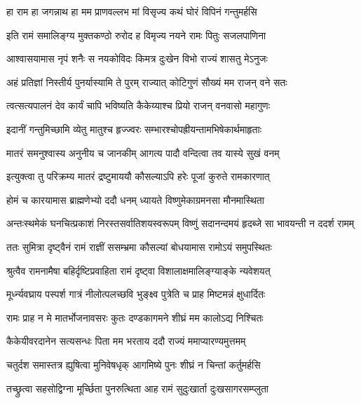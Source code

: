 \twolineshloka
{हा राम हा जगन्नाथ हा मम प्राणवल्लभ}
{मां विसृज्य कथं घोरं विपिनं गन्तुमर्हसि} %

\twolineshloka
{इति रामं समालिङ्ग्य मुक्तकण्ठो रुरोद ह}
{विमृज्य नयने रामः पितुः सजलपाणिना} %

\twolineshloka
{आश्वासयामास नृपं शनैः स नयकोविदः}
{किमत्र दुःखेन विभो राज्यं शासतु मेऽनुजः} %

\twolineshloka
{अहं प्रतिज्ञां निस्तीर्य पुनर्यास्यामि ते पुरम्}
{राज्यात् कोटिगुणं सौख्यं मम राजन् वने सतः} %

\twolineshloka
{त्वत्सत्यपालनं देव कार्यं चापि भविष्यति}
{कैकेय्याश्च प्रियो राजन् वनवासो महागुणः} %

\twolineshloka
{इदानीं गन्तुमिच्छामि व्येतु मातुश्च हृज्ज्वरः}
{सम्भारश्चोपह्रीयन्तामभिषेकार्थमाहृताः} %

\twolineshloka
{मातरं समनुश्वास्य अनुनीय च जानकीम्}
{आगत्य पादौ वन्दित्वा तव यास्ये सुखं वनम्} %

\twolineshloka
{इत्युक्त्वा तु परिक्रम्य मातरं द्रष्टुमाययौ}
{कौसल्याऽपि हरेः पूजां कुरुते रामकारणात्} %

\twolineshloka
{होमं च कारयामास ब्राह्मणेभ्यो ददौ धनम्}
{ध्यायते विष्णुमेकाग्रमनसा मौनमास्थिता} %

\fourlineindentedshloka
{अन्तःस्थमेकं घनचित्प्रकाशं}
{निरस्तसर्वातिशयस्वरूपम्}
{विष्णुं सदानन्दमयं हृदब्जे}
{सा भावयन्ती न ददर्श रामम्} %





\twolineshloka
{ततः सुमित्रा दृष्ट्वैनं रामं राज्ञीं ससम्भ्रमा}
{कौसल्यां बोधयामास रामोऽयं समुपस्थितः} %

\twolineshloka
{श्रुत्वैव रामनामैषा बहिर्दृष्टिप्रवाहिता}
{रामं दृष्ट्वा विशालाक्षमालिङ्ग्याङ्के न्यवेशयत्} %

\twolineshloka
{मूर्ध्न्यवघ्राय पस्पर्श गात्रं नीलोत्पलच्छवि}
{भुङ्क्ष्व पुत्रेति च प्राह मिष्टमन्नं क्षुधार्दितः} %

\twolineshloka
{रामः प्राह न मे मातर्भोजनावसरः कुतः}
{दण्डकागमने शीघ्रं मम कालोऽद्य निश्चितः} %

\twolineshloka
{कैकेयीवरदानेन सत्यसन्धः पिता मम}
{भरताय ददौ राज्यं ममाप्यारण्यमुत्तमम्} %

\twolineshloka
{चतुर्दश समास्तत्र ह्युषित्वा मुनिवेषधृक्}
{आगमिष्ये पुनः शीघ्रं न चिन्तां कर्तुमर्हसि} %

\twolineshloka
{तच्छ्रुत्वा सहसोद्विग्ना मूर्च्छिता पुनरुत्थिता}
{आह रामं सुदुःखार्ता दुःखसागरसम्प्लुता} %

